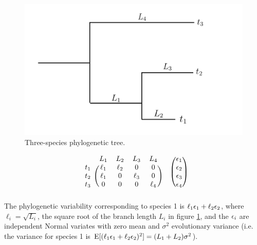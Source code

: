 \documentclass[12pt]{article}
\begin{document}
\begin{center}
\begin{figure}[H]
  \includegraphics[scale=0.8,page=1]{./figure/phylotree.png}
  \caption{Three-species phylogenetic tree.}
\label{fig:tree}
\end{figure}
\end{center}

\[
  \begin{blockarray}{ccccc}
  & L_1 & L_2 & L_3 & L_4  \\
  \begin{block}{c(cccc)}
  t_1 & \ell_1 & \ell_2 & 0           & 0 \\
  t_2 & \ell_1 &  0          & \ell_3 & 0 \\
  t_3 & 0           &  0          & 0           & \ell_4 \\
  \end{block}
  \end{blockarray}
  \hspace{0.5cm}
  \begin{blockarray}{(c)}
  \e_1 \\
  \e_2 \\
  \e_3 \\
  \e_4 \\
  \end{blockarray}
  \]
The phylogenetic variability corresponding to species 1 is $\ell_1 { \epsilon}_1 + \ell_2 { \epsilon}_2$, where $\ell_i = \sqrt{L_i}$, the square root of the branch length $L_i$ in figure \ref{fig:tree}, and the ${ \epsilon}_i$ are independent Normal variates with zero mean and $\sigma^2$ evolutionary variance (i.e. the variance for species 1 is $\textrm{E}[(\ell_1 { \epsilon}_1 + \ell_2 { \epsilon}_2)^2] = (L_1 + L_2)\sigma^2$).
\end{document}
